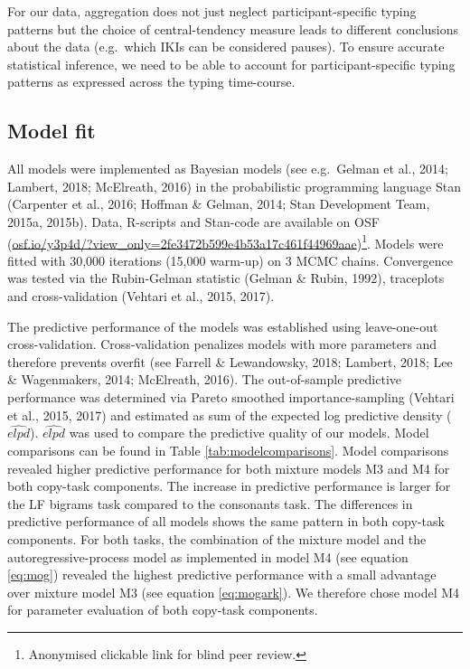 \documentclass[
  english,
  man,mask,floatsintext]{apa7}
\begin{document}
For our data, aggregation does not just neglect participant-specific typing patterns but the choice of central-tendency measure leads to different conclusions about the data (e.g.~which IKIs can be considered pauses). To ensure accurate statistical inference, we need to be able to account for participant-specific typing patterns as expressed across the typing time-course.

\hypertarget{model-fit}{%
\subsection{Model fit}\label{model-fit}}

All models were implemented as Bayesian models (see e.g.~Gelman et al., 2014; Lambert, 2018; McElreath, 2016) in the probabilistic programming language Stan (Carpenter et al., 2016; Hoffman \& Gelman, 2014; Stan Development Team, 2015a, 2015b). Data, R-scripts and Stan-code are available on OSF (\href{https://osf.io/y3p4d/?view_only=2fe3472b599e4b53a17c461f44969aae}{osf.io/y3p4d/?view\_only=2fe3472b599e4b53a17c461f44969aae})\footnote{Anonymised clickable link for blind peer review.}. Models were fitted with 30,000 iterations (15,000 warm-up) on 3 MCMC chains. Convergence was tested via the Rubin-Gelman statistic (Gelman \& Rubin, 1992), traceplots and cross-validation (Vehtari et al., 2015, 2017).

The predictive performance of the models was established using leave-one-out cross-validation. Cross-validation penalizes models with more parameters and therefore prevents overfit (see Farrell \& Lewandowsky, 2018; Lambert, 2018; Lee \& Wagenmakers, 2014; McElreath, 2016). The out-of-sample predictive performance was determined via Pareto smoothed importance-sampling (Vehtari et al., 2015, 2017) and estimated as sum of the expected log predictive density (\(\widehat{elpd}\)). \(\widehat{elpd}\) was used to compare the predictive quality of our models. Model comparisons can be found in Table \ref{tab:modelcomparisons}. Model comparisons revealed higher predictive performance for both mixture models M3 and M4 for both copy-task components. The increase in predictive performance is larger for the LF bigrams task compared to the consonants task. The differences in predictive performance of all models shows the same pattern in both copy-task components. For both tasks, the combination of the mixture model and the autoregressive-process model as implemented in model M4 (see equation \ref{eq:mog}) revealed the highest predictive performance with a small advantage over mixture model M3 (see equation \ref{eq:mogark}). We therefore chose model M4 for parameter evaluation of both copy-task components.
\end{document}
